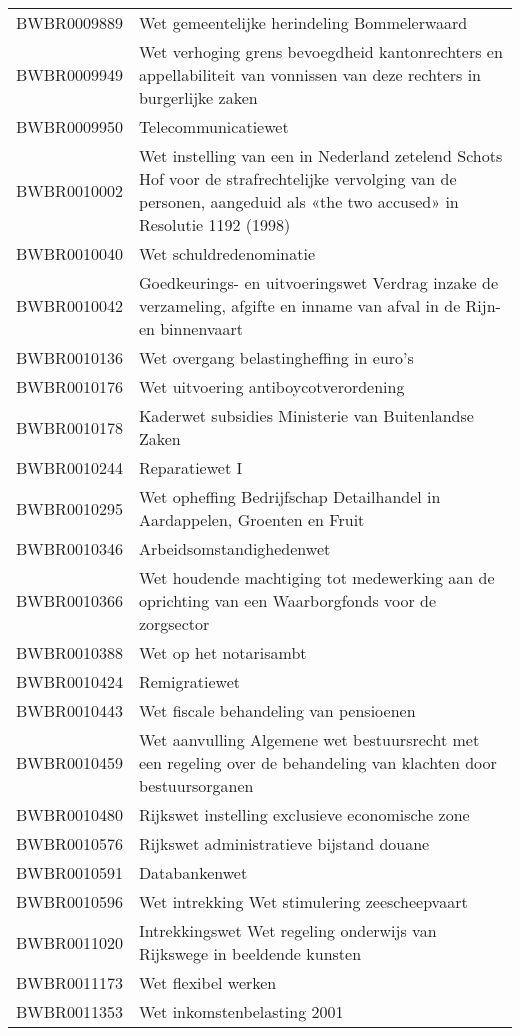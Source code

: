\begin{longtable}{lp{}}
BWBR0009889 & Wet gemeentelijke herindeling Bommelerwaard \\
BWBR0009949 & Wet verhoging grens bevoegdheid kantonrechters en appellabiliteit van vonnissen van deze rechters in burgerlijke zaken \\
BWBR0009950 & Telecommunicatiewet \\
BWBR0010002 & Wet instelling van een in Nederland zetelend Schots Hof voor de strafrechtelijke vervolging van de personen, aangeduid als «the two accused» in Resolutie 1192 (1998) \\
BWBR0010040 & Wet schuldredenominatie \\
BWBR0010042 & Goedkeurings- en uitvoeringswet Verdrag inzake de verzameling, afgifte en inname van afval in de Rijn- en binnenvaart \\
BWBR0010136 & Wet overgang belastingheffing in euro's \\
BWBR0010176 & Wet uitvoering antiboycotverordening \\
BWBR0010178 & Kaderwet subsidies Ministerie van Buitenlandse Zaken \\
BWBR0010244 & Reparatiewet I \\
BWBR0010295 & Wet opheffing Bedrijfschap Detailhandel in Aardappelen, Groenten en Fruit \\
BWBR0010346 & Arbeidsomstandighedenwet \\
BWBR0010366 & Wet houdende machtiging tot medewerking aan de oprichting van een Waarborgfonds voor de zorgsector \\
BWBR0010388 & Wet op het notarisambt \\
BWBR0010424 & Remigratiewet \\
BWBR0010443 & Wet fiscale behandeling van pensioenen \\
BWBR0010459 & Wet aanvulling Algemene wet bestuursrecht met een regeling over de behandeling van klachten door bestuursorganen \\
BWBR0010480 & Rijkswet instelling exclusieve economische zone \\
BWBR0010576 & Rijkswet administratieve bijstand douane \\
BWBR0010591 & Databankenwet \\
BWBR0010596 & Wet intrekking Wet stimulering zeescheepvaart \\
BWBR0011020 & Intrekkingswet Wet regeling onderwijs van Rijkswege in beeldende kunsten \\
BWBR0011173 & Wet flexibel werken \\
BWBR0011353 & Wet inkomstenbelasting 2001 \\

\end{longtable}
